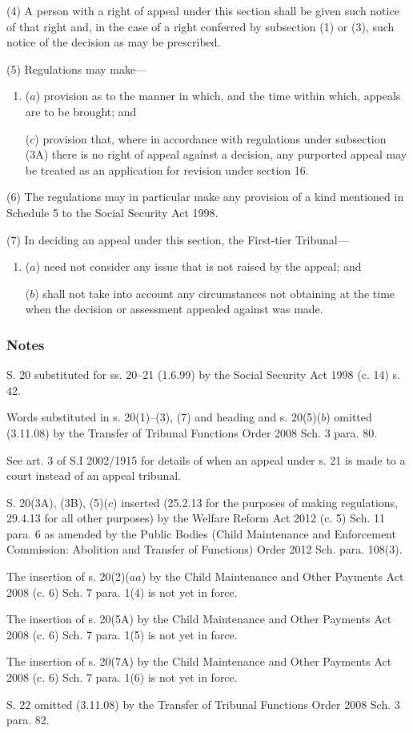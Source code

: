 \documentclass[a4paper]{article}
\newcommand\amendment[1]{\subsubsection*{Notes}{\itshape\frenchspacing\footnotesize #1 \par}}
\begin{document}
{(4) A person with a right of appeal under this section shall be given such notice of that right and, in the case of a right conferred by subsection (1) or (3), such notice of the decision as may be prescribed.

(5) Regulations may make---
\begin{enumerate}\item[]
($a$) provision as to the manner in which, and the time within which, appeals are to be brought; and

($c$) provision that, where in accordance with regulations under subsection (3A) there is no right of appeal against a decision, any purported appeal may be treated as an application for revision under section 16.
\end{enumerate}

(6)
The regulations may in particular make any provision of a kind mentioned in Schedule 5 to the Social Security Act 1998.

(7)
In deciding an appeal under this section, the First-tier Tribunal---
\begin{enumerate}\item[]
($a$) need not consider any issue that is not raised by the appeal; and

($b$) shall not take into account any circumstances not obtaining at the time when the decision or assessment appealed against was made.
\end{enumerate}


\amendment{

S. 20 substituted for ss. 20--21 (1.6.99) by the Social Security Act 1998 (c. 14) s. 42.

Words substituted in s. 20(1)--(3), (7) and heading and s. 20(5)($b$) omitted (3.11.08) by the Transfer of Tribunal Functions Order 2008 Sch. 3 para. 80. 

See art. 3 of S.I 2002/1915 for details of when an appeal under s. 21 is made to a court instead of an appeal tribunal.

S. 20(3A), (3B), (5)($c$) inserted (25.2.13 for the purposes of making regulations, 29.4.13 for all other purposes) by the Welfare Reform Act 2012 (c. 5) Sch. 11 para. 6 as amended by the Public Bodies (Child Maintenance and Enforcement Commission: Abolition and Transfer of Functions) Order 2012 Sch. para. 108(3).

The insertion of s. 20(2)($aa$) by the Child Maintenance and Other Payments Act 2008 (c. 6) Sch. 7 para. 1(4) is not yet in force.

The insertion of s. 20(5A) by the Child Maintenance and Other Payments Act 2008 (c. 6) Sch. 7 para. 1(5) is not yet in force.

The insertion of s. 20(7A) by the Child Maintenance and Other Payments Act 2008 (c. 6) Sch. 7 para. 1(6) is not yet in force.

\medskip

S. 22 omitted (3.11.08) by the Transfer of Tribunal Functions Order 2008 Sch. 3 para. 82.

}
}
\end{document}
